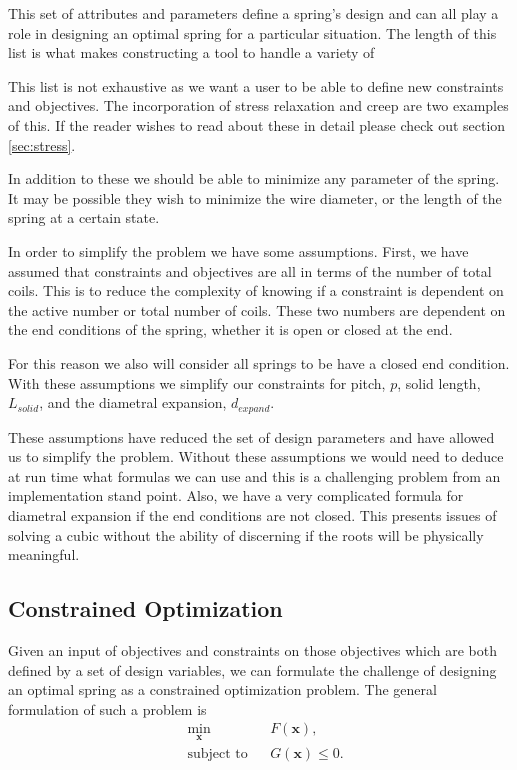 \documentclass[10pt]{article}
\begin{document}
This set of attributes and parameters define a spring's design and can all play a role in designing an optimal spring for a particular situation. The length of this list is what makes constructing a tool to handle a variety of 



This list is not exhaustive as we want a user to be able to define new constraints and objectives. The incorporation of stress relaxation and creep are two examples of this. If the reader wishes to read about these in detail please check out section \ref{sec:stress}. 

In addition to these we should be able to minimize any parameter of the spring. It may be possible they wish to minimize the wire diameter, or the length of the spring at a certain state.  

In order to simplify the problem we have some assumptions. First, we have assumed that constraints and objectives are all in terms of the number of total coils. This is to reduce the complexity of knowing if a constraint is dependent on the active number or total number of coils. These two numbers are dependent on the end conditions of the spring, whether it is open or closed at the end. 

For this reason we also will consider all springs to be have a closed end condition. With these assumptions we simplify our constraints for pitch, $p$, solid length, $L_{solid}$, and the diametral expansion, $d_{expand}$.


These assumptions have reduced the set of design parameters and have allowed us to simplify the problem. Without these assumptions we would need to deduce at run time what formulas we can use and this is a challenging problem from an implementation stand point. Also, we have a very complicated formula for diametral expansion if the end conditions are not closed. This presents issues of solving a cubic without the ability of discerning if the roots will be physically meaningful. 


\subsection{Constrained Optimization}
\label{sec:Constrained_Optimization}

Given an input of objectives and constraints on those objectives which are both defined by a set of design variables, we can formulate the challenge of designing an optimal spring as a constrained optimization problem. The general formulation of such a problem is 
				\begin{equation*}
 					\begin{aligned}
 						& \underset{\textbf{x}}{\text{min}}
 						& & F(\textbf{x}), \\
 						& \text{subject to}
 						& & G(\textbf{x}) \le 0.
 					\end{aligned}
				\end{equation*}
\end{document}
